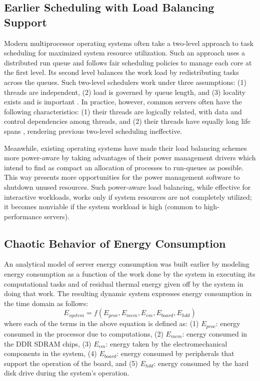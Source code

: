 \documentclass[times, 10pt,twocolumn]{IEEEtran}
\begin{document}
\subsection{Earlier Scheduling with Load Balancing Support}
\label{sec:therm-comp-workl}
Modern multiprocessor operating systems often take a two-level approach
to task scheduling for maximized system resource utilization. Such an
approach uses a distributed run queue and follows fair scheduling
policies to manage each core at the first level.  Its second level
balances the work load by redistributing tasks across the queues.  Such
two-level schedulers work under three assumptions: (1) threads are
independent, (2) load is governed by queue length, and (3) locality
exists and is important \cite{Hofmeyr2010}.  In practice, however,
common servers often have the following characteristics: (1) their
threads are logically related, with data and control dependencies among
threads, and (2) their threads have equally long life spans
\cite{Hofmeyr2010}, rendering previous two-level scheduling ineffective.

Meanwhile, existing operating systems have made their load balancing
schemes more power-aware by taking advantages of their power management
drivers which intend to find as compact an allocation of processes to
run-queues as possible.  This way presents more opportunities for the
power management software to shutdown unused resources.  Such
power-aware load balancing, while effective for interactive workloads,
works only if system resources are not completely utilized; it becomes
nonviable if the system workload is high (common to high-performance
servers).

\subsection{Chaotic Behavior of Energy Consumption}
\label{sec:chaot-pred-energy}
An analytical model of server energy consumption was built earlier
\cite{Lewis2008,Lewis2010} by modeling energy consumption as a
function of the work done by the system in executing its computational
tasks and of residual thermal energy given off by the system in doing
that work.  The resulting dynamic system expresses energy consumption in
the time domain as follows:
\begin{equation}
  \label{eq:system}
  E_{system}=f(E_{proc},E_{mem},E_{em},E_{board},E_{hdd})
\end{equation}
where each of the terms in the above equation is defined as: (1)
$E_{proc}$: energy consumed in the processor due to computations, (2)
$E_{mem}$: energy consumed in the DDR SDRAM chips, (3) $E_{em}$: energy
taken by the electromechanical components in the system, (4)
$E_{board}$: energy consumed by peripherals that support the operation
of the board, and (5) $E_{hdd}$: energy consumed by the hard disk drive
during the system's operation.
\end{document}
